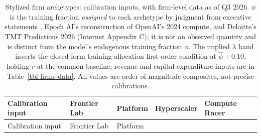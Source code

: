 \documentclass[
  11pt,
  letterpaper,
]{scrartcl}
\begin{document}
\begin{longtable}[]{@{}
  >{\raggedright\arraybackslash}p{}
  >{\raggedright\arraybackslash}p{}
  >{\raggedright\arraybackslash}p{}
  >{\raggedright\arraybackslash}p{}
  >{\raggedright\arraybackslash}p{}@{}}
\caption{Stylized firm archetypes: calibration inputs, with firm-level
data as of Q3 2026. \(\hat{\phi}\) is the training fraction
\emph{assigned} to each archetype by judgment from executive statements
\citep{amodei2026dwarkesh}, Epoch AI's reconstruction of OpenAI's 2024
compute, and Deloitte's TMT Predictions 2026 (Internet Appendix C); it
is not an observed quantity and is distinct from the model's endogenous
training fraction \(\phi\). The implied \(\lambda\) band inverts the
closed-form training-allocation first-order condition at
\(\hat{\phi} \pm 0.10\), holding \(r\) at the common baseline; revenue
and capital-expenditure inputs are in Table~\ref{tbl-firms-data}. All
values are order-of-magnitude composites, not precise
calibrations.}\label{tbl-firms}\tabularnewline
\toprule\noalign{}
\begin{minipage}[b]{\linewidth}\raggedright
Calibration input
\end{minipage} & \begin{minipage}[b]{\linewidth}\raggedright
Frontier Lab
\end{minipage} & \begin{minipage}[b]{\linewidth}\raggedright
Platform
\end{minipage} & \begin{minipage}[b]{\linewidth}\raggedright
Hyperscaler
\end{minipage} & \begin{minipage}[b]{\linewidth}\raggedright
Compute Racer
\end{minipage} \\
\midrule\noalign{}
\endfirsthead
\toprule\noalign{}
\begin{minipage}[b]{\linewidth}\raggedright
Calibration input
\end{minipage} & \begin{minipage}[b]{\linewidth}\raggedright
Frontier Lab
\end{minipage} & \begin{minipage}[b]{\linewidth}\raggedright
Platform
\end{minipage} & \begin{minipage}[b]{\linewidth}\raggedright

\end{minipage}
\end{longtable}
\end{document}
